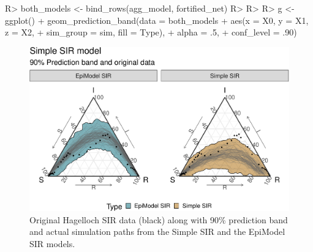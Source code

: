 \documentclass[
  shortnames]{jss}
\begin{document}
\begin{CodeChunk}
\begin{CodeInput}
R> both_models <- bind_rows(agg_model, fortified_net)
R> 
R> 
R> g <- ggplot() + geom_prediction_band(data = both_models %
+          aes(x = X0, y = X1, z = X2,
+               sim_group = sim, fill = Type),
+          alpha = .5,
+          conf_level = .90) 
\end{CodeInput}
\end{CodeChunk}

\begin{CodeChunk}
\begin{figure}[H]

{\centering \includegraphics{Figs/unnamed-chunk-17-1} 

}

\caption{\label{fig:hag-simple-sir}  Original Hagelloch SIR data (black) along with 90\% prediction band and actual simulation paths from the Simple SIR and the EpiModel SIR models.}\label{fig:unnamed-chunk-17}
\end{figure}
\end{CodeChunk}
\end{document}
